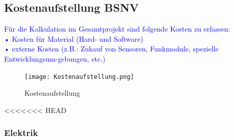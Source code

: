 \newpage
\subsection{Kostenaufstellung BSNV}
\textcolor{blue}{Für die Kalkulation im Gesamtprojekt sind folgende Kosten zu erfassen: \\
•	Kosten für Material (Hard- und Software)\\
•	externe Kosten (z.B.: Zukauf von Sensoren, Funkmodule, spezielle Entwicklungsum-gebungen, etc.) 
}
\begin{figure}[h]
    \texttt{[image: Kostenaufstellung.png]}
    \centering
    \caption{Kostenaufstellung}
\end{figure}


\newpage
<<<<<<< HEAD
\subsubsection{Elektrik}
